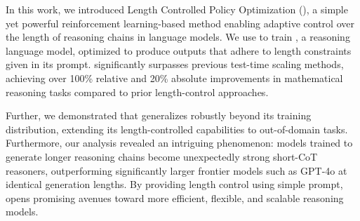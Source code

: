 In this work, we introduced Length Controlled Policy Optimization (\ours{}), a simple yet powerful reinforcement learning-based method enabling adaptive control over the length of reasoning chains in language models. We use \ours{} to train \model{}, a reasoning language model, optimized to produce outputs that adhere to length constraints given in its prompt. \ours{} significantly surpasses previous test-time scaling methods, achieving over 100\% relative and 20\% absolute improvements in mathematical reasoning tasks compared to prior length-control approaches.

Further, we demonstrated that \model{} generalizes robustly beyond its training distribution, extending its length-controlled capabilities to out-of-domain tasks. Furthermore, our analysis revealed an intriguing phenomenon: models trained to generate longer reasoning chains become unexpectedly strong short-CoT reasoners, outperforming significantly larger frontier models such as GPT-4o at identical generation lengths. 
By providing length control using simple prompt, \ours{} opens promising avenues toward more efficient, flexible, and scalable reasoning models.